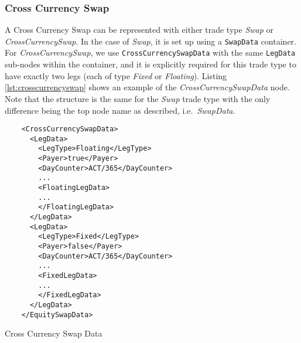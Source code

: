 \subsubsection{Cross Currency Swap}
\label{ss:cross_currency_swap}

A Cross Currency Swap can be represented with either trade type \emph{Swap} or \emph{CrossCurrencySwap}. In the case of \emph{Swap}, it is set up using a {\tt SwapData} container. For \emph{CrossCurrencySwap}, we use {\tt CrossCurrencySwapData} with the same {\tt LegData} sub-nodes within the container, and it is explicitly required for this trade type to have exactly two legs (each of type \emph{Fixed} or \emph{Floating}). Listing \ref{lst:crosscurrencyswap} shows an example of the \emph{CrossCurrencySwapData} node. Note that the structure is the same for the \emph{Swap} trade type with the only difference being the top node name as described, i.e.\ \emph{SwapData}.

\begin{listing}[H]
\begin{verbatim}
    <CrossCurrencySwapData>
      <LegData>
        <LegType>Floating</LegType>
        <Payer>true</Payer>
        <DayCounter>ACT/365</DayCounter>
        ...
        <FloatingLegData>
        ...
        </FloatingLegData>
      </LegData>
      <LegData>
        <LegType>Fixed</LegType>
        <Payer>false</Payer>
        <DayCounter>ACT/365</DayCounter>
        ...
        <FixedLegData>
        ...
        </FixedLegData>
      </LegData>
    </EquitySwapData>
\end{verbatim}
\caption{Cross Currency Swap Data}
\label{lst:crosscurrencyswap}
\end{listing}
